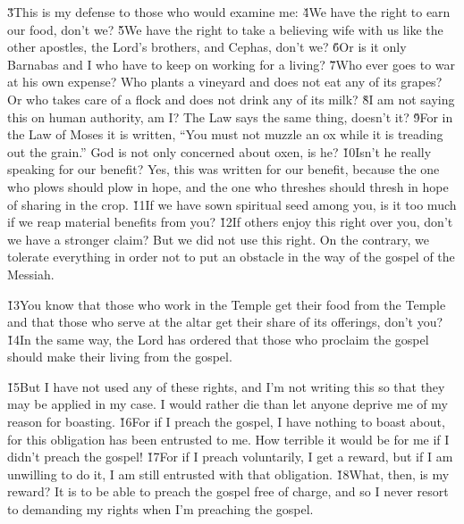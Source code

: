 \v{3}This is my defense to those who would examine me: \v{4}We have the right to earn our food, don't we? \v{5}We have the right to take a believing wife with us like the other apostles, the Lord's brothers, and Cephas, don't we? \v{6}Or is it only Barnabas and I who have to keep on working for a living? \v{7}Who ever goes to war at his own expense? Who plants a vineyard and does not eat any of its grapes? Or who takes care of a flock and does not drink any of its milk? \v{8}I am not saying this on human authority, am I? The Law says the same thing, doesn't it? \v{9}For in the Law of Moses it is written, ``You must not muzzle an ox while it is treading out the grain.'' God is not only concerned about oxen, is he? \v{10}Isn't he really speaking for our benefit? Yes, this was written for our benefit, because the one who plows should plow in hope, and the one who threshes should thresh in hope of sharing in the crop. \v{11}If we have sown spiritual seed among you, is it too much if we reap material benefits from you? \v{12}If others enjoy this right over you, don't we have a stronger claim? But we did not use this right. On the contrary, we tolerate everything in order not to put an obstacle in the way of the gospel of the Messiah.

\v{13}You know that those who work in the Temple get their food from the Temple and that those who serve at the altar get their share of its offerings, don't you? \v{14}In the same way, the Lord has ordered that those who proclaim the gospel should make their living from the gospel.

\v{15}But I have not used any of these rights, and I'm not writing this so that they may be applied in my case. I would rather die than let anyone deprive me of my reason for boasting. \v{16}For if I preach the gospel, I have nothing to boast about, for this obligation has been entrusted to me. How terrible it would be for me if I didn't preach the gospel! \v{17}For if I preach voluntarily, I get a reward, but if I am unwilling to do it, I am still entrusted with that obligation. \v{18}What, then, is my reward? It is to be able to preach the gospel free of charge, and so I never resort to demanding my rights when I'm preaching the gospel.

